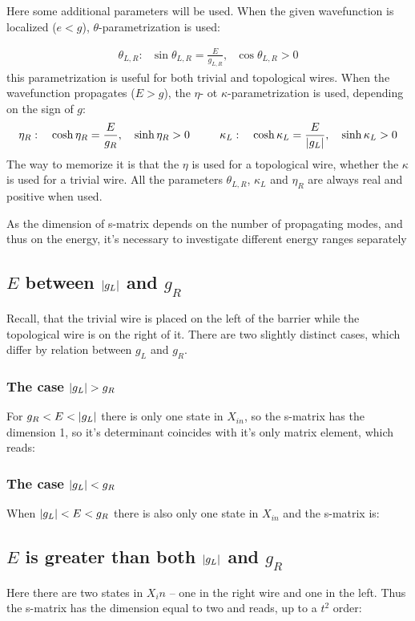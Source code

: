 Here some additional parameters will be used. When the given wavefunction is localized ($ e<g $), $ \theta $-parametrization is used:

\begin{gather}
\theta_{L,R}:~~~\sin \theta_{L,R} =\frac{E}{g_{L,R}},~~~\cos \theta_{L,R}>0
\end{gather}
this parametrization is useful for both trivial and topological wires. When the wavefunction propagates ($ E>g $), the $ \eta $- ot $ \kappa $-parametrization is used, depending on the sign of $ g $:
\begin{gather}
	\eta_R: ~~~\cosh\eta_R = \frac{E}{g_R},~~~\sinh \eta_R >0
	~~~~~~~~
	\kappa_L: ~~~ \cosh\kappa_L= \frac{E}{\left|g_{L}\right|},~~~\sinh \kappa_L>0
\end{gather}
The way to memorize it is that the $ \eta $ is used for a topological wire, whether the $ \kappa $ is used for a trivial wire. All the parameters $ \theta_{L,R}  $,  $\kappa_L $ and $ \eta_R $ are always real and positive when used.

As the dimension of  s-matrix depends on the number of propagating modes, and thus on the energy, it's necessary to investigate different energy ranges separately 
\subsection{$ E $ \hspace{0pt} between $ \left|g_L\right| $ and $ g_R $}
	
Recall, that the trivial wire is placed on the left of the barrier while the topological wire is on the right of it. There are two slightly distinct cases, which differ by relation between $ g_L $ and $ g_R $.
\subsubsection{The case $ \left|g_L\right| > g_R $}

For $ g_R<E<\left|g_L\right| $ there is only one state in $ X_{in} $, so the s-matrix has the dimension 1, so it's determinant coincides with it's only matrix element, which reads:

\subsubsection{The case $ \left|g_L\right| < g_R $}
When $ \left|g_L\right|<E<g_R $ there is also only one state in $ X_{in} $ and the s-matrix is:


\subsection{$ E $ \hspace{0pt} is greater than both $ \left|g_L\right| $ and $ g_R $}

Here there are two states in $ X_in $ -- one in the right wire and one in the left. Thus the s-matrix has the dimension equal to two and reads, up to a $ t^2 $ order:

